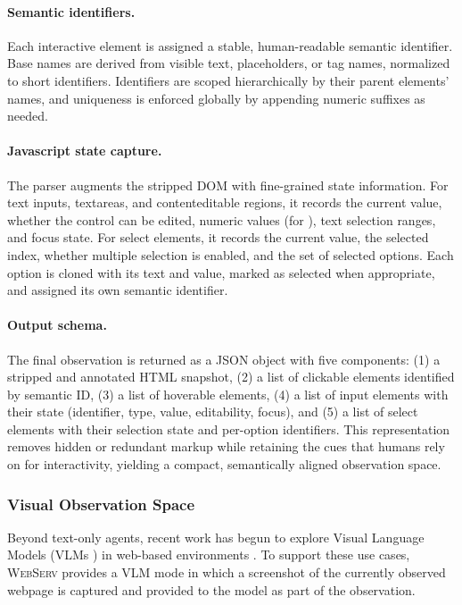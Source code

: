 \documentclass{article}
\DeclareRobustCommand{\projectname}{\textsc{WebServ}\xspace}
\begin{document}
\paragraph{Semantic identifiers.} Each interactive element is assigned a stable, human-readable semantic identifier. Base names are derived from visible text, placeholders, or tag names, normalized to short identifiers. Identifiers are scoped hierarchically by their parent elements' names, and uniqueness is enforced globally by appending numeric suffixes as needed. 

\paragraph{Javascript state capture.} The parser augments the stripped DOM with fine-grained state information. For text inputs, textareas, and contenteditable regions, it records the current value, whether the control can be edited, numeric values (for ), text selection ranges, and focus state. For select elements, it records the current value, the selected index, whether multiple selection is enabled, and the set of selected options. Each option is cloned with its text and value, marked as selected when appropriate, and assigned its own semantic identifier.

\paragraph{Output schema.} The final observation is returned as a JSON object with five components: (1) a stripped and annotated HTML snapshot, (2) a list of clickable elements identified by semantic ID, (3) a list of hoverable elements, (4) a list of input elements with their state (identifier, type, value, editability, focus), and (5) a list of select elements with their selection state and per-option identifiers. This representation removes hidden or redundant markup while retaining the cues that humans rely on for interactivity, yielding a compact, semantically aligned observation space.

\subsubsection{Visual Observation Space}
Beyond text-only agents, recent work has begun to explore Visual Language Models (VLMs \cite{yinSurveyMultimodalLarge2024}) in web-based environments \cite{kohVisualWebArenaEvaluatingMultimodal2024}. To support these use cases, \projectname provides a VLM mode in which a screenshot of the currently observed webpage is captured and provided to the model as part of the observation.
\end{document}
